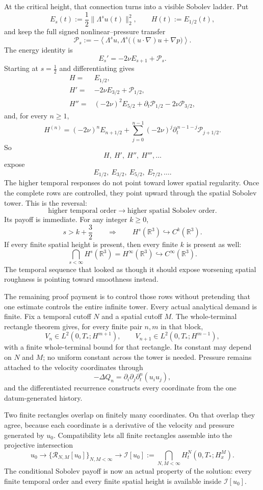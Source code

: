 \documentclass[11pt]{article}
\begin{document}
At the critical height, that connection turns into a visible Sobolev ladder. Put
\[
E_s(t):=\frac12\|\Lambda^su(t)\|_2^2,
\qquad
H(t):=E_{1/2}(t),
\]
and keep the full signed nonlinear--pressure transfer
\[
\mathcal P_s
:=-\left\langle
\Lambda^su,
\Lambda^s\bigl((u\cdot\nabla)u+\nabla p\bigr)
\right\rangle.
\]
The energy identity is
\[
E_s'=-2\nu E_{s+1}+\mathcal P_s.
\]
Starting at $s=\tfrac12$ and differentiating gives
\[
\begin{aligned}
H={}&E_{1/2},\\
H'={}&-2\nu E_{3/2}+\mathcal P_{1/2},\\
H''={}&(-2\nu)^2E_{5/2}
+\partial_t\mathcal P_{1/2}
-2\nu\mathcal P_{3/2},
\end{aligned}
\]
and, for every $n\ge1$,
\[
H^{(n)}
=(-2\nu)^nE_{n+1/2}
+\sum_{j=0}^{n-1}(-2\nu)^j
\partial_t^{\,n-1-j}\mathcal P_{j+1/2}.
\]
So
\[
H,\ H',\ H'',\ H''',\ldots
\]
expose
\[
E_{1/2},\ E_{3/2},\ E_{5/2},\ E_{7/2},\ldots.
\]
The higher temporal responses do not point toward lower spatial regularity. Once the complete rows are controlled, they point upward through the spatial Sobolev tower. This is the reversal:
\[
\text{higher temporal order}
\longrightarrow
\text{higher spatial Sobolev order}.
\]
Its payoff is immediate. For any integer $k\ge0$,
\[
s>k+\frac32
\qquad\Longrightarrow\qquad
H^s(\mathbb R^3)\hookrightarrow C^k(\mathbb R^3).
\]
If every finite spatial height is present, then every finite $k$ is present as well:
\[
\bigcap_{s<\infty}H^s(\mathbb R^3)
=H^\infty(\mathbb R^3)
\hookrightarrow C^\infty(\mathbb R^3).
\]
The temporal sequence that looked as though it should expose worsening spatial roughness is pointing toward smoothness instead.

The remaining proof payment is to control those rows without pretending that one estimate controls the entire infinite tower. Every actual analytical demand is finite. Fix a temporal cutoff $N$ and a spatial cutoff $M$. The whole-terminal rectangle theorem gives, for every finite pair $n,m$ in that block,
\[
V_n\in L^2(0,T_*;H^{m+1}),
\qquad
V_{n+1}\in L^2(0,T_*;H^{m-1}),
\]
with a finite whole-terminal bound for that rectangle. Its constant may depend on $N$ and $M$; no uniform constant across the tower is needed. Pressure remains attached to the velocity coordinates through
\[
-\Delta Q_n
=
\partial_i\partial_j\partial_t^n(u_i u_j),
\]
and the differentiated recurrence constructs every coordinate from the one datum-generated history.

Two finite rectangles overlap on finitely many coordinates. On that overlap they agree, because each coordinate is a derivative of the velocity and pressure generated by $u_0$. Compatibility lets all finite rectangles assemble into the projective intersection
\[
u_0
\longrightarrow
\{\mathcal R_{N,M}[u_0]\}_{N,M<\infty}
\longrightarrow
\mathcal I[u_0]
:=
\bigcap_{N,M<\infty}H_t^N(0,T_*;H_x^M).
\]
The conditional Sobolev payoff is now an actual property of the solution: every finite temporal order and every finite spatial height is available inside $\mathcal I[u_0]$.
\end{document}
